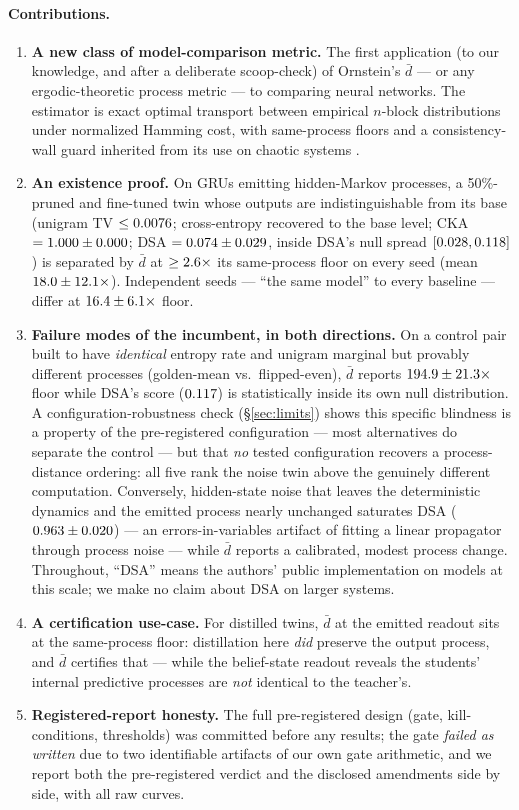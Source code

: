 \documentclass[11pt]{article}
\newcommand{\dbar}{\bar d}
\begin{document}
\paragraph{Contributions.}
\begin{enumerate}\itemsep2pt
\item \textbf{A new class of model-comparison metric.} The first application (to our
knowledge, and after a deliberate scoop-check) of Ornstein's $\dbar$ --- or any
ergodic-theoretic process metric --- to comparing neural networks. The estimator is
exact optimal transport between empirical $n$-block distributions under normalized
Hamming cost, with same-process floors and a consistency-wall guard inherited from its
use on chaotic systems \citep{howe2026beyond}.
\item \textbf{An existence proof.} On GRUs emitting hidden-Markov processes, a
50\%-pruned and fine-tuned twin whose outputs are indistinguishable from its base
(unigram TV $\le 0.0076$; cross-entropy recovered to the base level; CKA
$=1.000 \pm 0.000$; DSA $=0.074 \pm 0.029$, inside DSA's null spread
$[0.028, 0.118]$) is separated by $\dbar$ at $\ge 2.6\times$
its same-process floor on every seed (mean $18.0 \pm 12.1\times$). Independent
seeds --- ``the same model'' to every baseline --- differ at $16.4 \pm 6.1\times$ floor.
\item \textbf{Failure modes of the incumbent, in both directions.} On a control pair
built to have \emph{identical} entropy rate and unigram marginal but provably
different processes (golden-mean vs.\ flipped-even), $\dbar$ reports
$194.9 \pm 21.3\times$ floor while DSA's score ($0.117$) is statistically inside
its own null distribution. A configuration-robustness check (\S\ref{sec:limits})
shows this specific blindness is a property of the pre-registered configuration ---
most alternatives do separate the control --- but that \emph{no} tested
configuration recovers a process-distance ordering: all five rank the noise twin
above the genuinely different computation. Conversely, hidden-state noise that leaves the deterministic
dynamics and the emitted process nearly unchanged saturates DSA ($0.963 \pm 0.020$) --- an
errors-in-variables artifact of fitting a linear propagator through process noise ---
while $\dbar$ reports a calibrated, modest process change. Throughout, ``DSA''
means the authors' public implementation on models at this scale; we make no claim
about DSA on larger systems.
\item \textbf{A certification use-case.} For distilled twins, $\dbar$ at the emitted
readout sits at the same-process floor: distillation here \emph{did} preserve the
output process, and $\dbar$ certifies that --- while the belief-state readout reveals
the students' internal predictive processes are \emph{not} identical to the
teacher's.
\item \textbf{Registered-report honesty.} The full pre-registered design (gate,
kill-conditions, thresholds) was committed before any results; the gate \emph{failed
as written} due to two identifiable artifacts of our own gate arithmetic, and we
report both the pre-registered verdict and the disclosed amendments side by side, with
all raw curves.
\end{enumerate}
\end{document}
